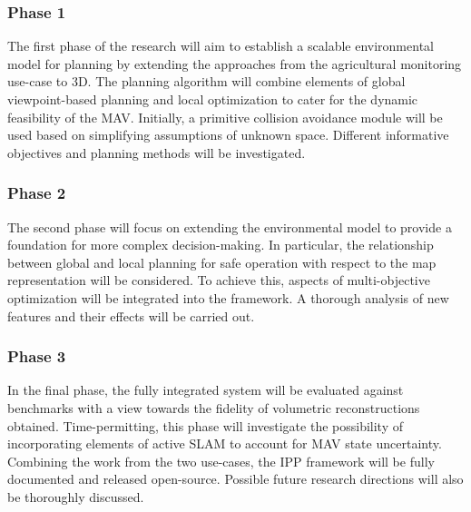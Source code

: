 \subsubsection{Phase 1}

The first phase of the research will aim to establish a scalable environmental model for planning by 
extending the approaches from the agricultural monitoring use-case to 3D. The planning algorithm will 
combine elements of global viewpoint-based planning and local optimization to cater for the dynamic 
feasibility of the MAV. Initially, a primitive collision avoidance module will be used based on simplifying 
assumptions of unknown space. Different informative objectives and planning methods will be investigated.

\subsubsection{Phase 2}

The second phase will focus on extending the environmental model to provide a foundation for more 
complex decision-making. In particular, the relationship between global and local 
planning for safe operation with respect to the map representation will be considered. To achieve this, 
aspects of multi-objective optimization will be integrated into the framework. A thorough analysis of new 
features and their effects will be carried out.

\subsubsection{Phase 3}

In the final phase, the fully integrated system will be evaluated against benchmarks with a view 
towards the fidelity of volumetric reconstructions obtained. Time-permitting, this phase will investigate the 
possibility of incorporating elements of active SLAM to account for MAV state uncertainty. Combining the work 
from the two use-cases, the IPP framework will be fully documented and released open-source. 
Possible future research directions will also be thoroughly discussed.